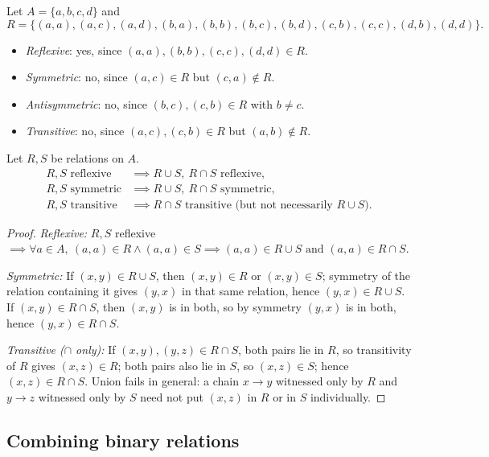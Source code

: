 \begin{example}
Let $A = \{a,b,c,d\}$ and
\[
R = \{(a,a),(a,c),(a,d),(b,a),(b,b),(b,c),(b,d),(c,b),(c,c),(d,b),(d,d)\}.
\]
\begin{itemize}
    \item \emph{Reflexive}: yes, since $(a,a),(b,b),(c,c),(d,d) \in R$.
    \item \emph{Symmetric}: no, since $(a,c) \in R$ but $(c,a) \notin R$.
    \item \emph{Antisymmetric}: no, since $(b,c),(c,b) \in R$ with $b \neq c$.
    \item \emph{Transitive}: no, since $(a,c),(c,b) \in R$ but $(a,b) \notin R$.
\end{itemize}
\end{example}

\begin{proposition}
Let $R,S$ be relations on $A$.
\begin{align*}
R,S \text{ reflexive} &\implies R\cup S,\ R\cap S \text{ reflexive}, \\
R,S \text{ symmetric} &\implies R\cup S,\ R\cap S \text{ symmetric}, \\
R,S \text{ transitive} &\implies R\cap S \text{ transitive (but not necessarily } R\cup S\text{)}.
\end{align*}
\end{proposition}
\begin{proof}
\emph{Reflexive:} $R,S$ reflexive $\implies \forall a\in A,\ (a,a)\in R \wedge (a,a)\in S \implies (a,a) \in R\cup S \text{ and } (a,a)\in R\cap S$.

\emph{Symmetric:} If $(x,y) \in R\cup S$, then $(x,y)\in R$ or $(x,y)\in S$; symmetry of the relation containing it gives $(y,x)$ in that same relation, hence $(y,x)\in R\cup S$. If $(x,y)\in R\cap S$, then $(x,y)$ is in both, so by symmetry $(y,x)$ is in both, hence $(y,x)\in R\cap S$.

\emph{Transitive ($\cap$ only):} If $(x,y),(y,z) \in R\cap S$, both pairs lie in $R$, so transitivity of $R$ gives $(x,z)\in R$; both pairs also lie in $S$, so $(x,z)\in S$; hence $(x,z)\in R\cap S$. Union fails in general: a chain $x\to y$ witnessed only by $R$ and $y\to z$ witnessed only by $S$ need not put $(x,z)$ in $R$ or in $S$ individually.
\end{proof}

\subsection{Combining binary relations}
\label{sec:2-15}

